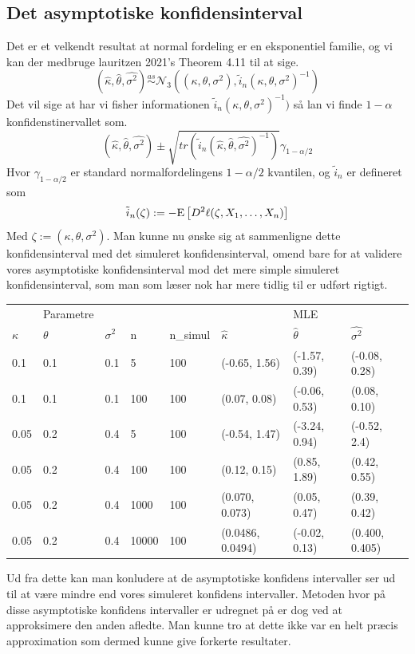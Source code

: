 \documentclass{article}
\theoremstyle{definition}
\theoremstyle{remark}
\begin{document}
\subsection{Det asymptotiske konfidensinterval}
Det er et velkendt resultat at normal fordeling er en eksponentiel familie, og vi kan der medbruge lauritzen 2021's Theorem 4.11 til at sige.
$$(\hat\kappa,\hat\theta,\hat{\sigma^2})\overset{as}{\sim}\mathcal N_3((\kappa,\theta,\sigma^2),\tilde{i}_n (\kappa,\theta,\sigma^2)^{-1})$$
Det vil sige at har vi fisher informationen $\tilde{i}_n (\kappa,\theta,\sigma^2)^{-1})$ så lan vi finde $1-\alpha$ konfidenstinervallet som.
$$(\hat\kappa,\hat\theta,\hat{\sigma^2})\pm \sqrt{tr(\tilde{i}_n (\hat\kappa,\hat\theta,\hat{\sigma^2})^{-1})}\gamma_{1-\alpha/2}$$
Hvor $\gamma_{1-\alpha/2}$ er standard normalfordelingens $1-\alpha/2$ kvantilen, og $\tilde i_n$ er defineret som
$$\tilde{i}_n (\zeta):= -\text E\left[D^2\ell (\zeta,X_1,\hdots,X_n)\right]$$
Med $\zeta := (\kappa,\theta,\sigma^2)$. Man kunne nu ønske sig at sammenligne dette konfidensinterval med det simuleret konfidensinterval, omend bare for at validere vores asymptotiske konfidensinterval mod det mere simple simuleret konfidensinterval, som man som læser nok har mere tidlig til er udført rigtigt.
\begin{center}
\begin{tabular}{llllllll}
 &Parametre&& &&& MLE  \\
 $\kappa$&$\theta$&$\sigma^2$&n&n\_simul&$\hat \kappa$&$\hat\theta$&$\hat{\sigma^2}$ \\
 0.1 & 0.1 & 0.1 & 5& 100 & (-0.65, 1.56)&(-1.57, 0.39)&(-0.08, 0.28)\\
 0.1 & 0.1 & 0.1 & 100& 100 & (0.07, 0.08)&(-0.06, 0.53)&(0.08, 0.10)\\
 0.05&0.2&0.4&5&100&(-0.54, 1.47)&(-3.24, 0.94)&(-0.52, 2.4)\\
 0.05&0.2&0.4&100&100&(0.12, 0.15)&(0.85, 1.89)&(0.42, 0.55)\\
 0.05&0.2&0.4&1000&100&(0.070, 0.073)&(0.05, 0.47)&(0.39, 0.42)\\
 0.05&0.2&0.4&10000&100&(0.0486, 0.0494)&(-0.02, 0.13)&(0.400, 0.405)
\end{tabular}
\end{center}
Ud fra dette kan man konludere at de asymptotiske konfidens intervaller ser ud til at være mindre end vores simuleret konfidens intervaller. Metoden hvor på disse asymptotiske konfidens intervaller er udregnet på er dog ved at approksimere den anden afledte. Man kunne tro at dette ikke var en helt præcis approximation som dermed kunne give forkerte resultater. 
\end{document}
